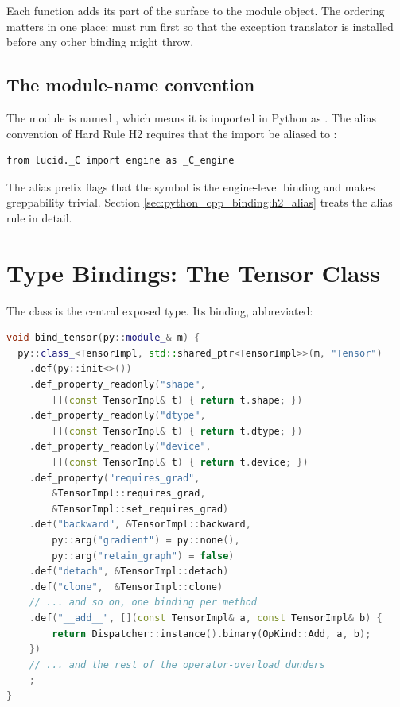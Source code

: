 Each  function adds its part of the
surface to the module object. The ordering matters in one place:
 must run first so that the exception translator
is installed before any other binding might throw.

\subsection{The module-name convention}
\label{ssec:python_cpp_binding:name_convention}

The module is named , which means it is imported in
Python as . The alias convention
of Hard Rule H2 requires that the import be aliased to
:

\begin{lstlisting}[style=lucid,language=LucidPython]
from lucid._C import engine as _C_engine
\end{lstlisting}

The alias prefix  flags that the symbol is the
engine-level binding and makes greppability trivial. Section
\ref{sec:python_cpp_binding:h2_alias} treats the alias rule in
detail.

\section{Type Bindings: The Tensor Class}
\label{sec:python_cpp_binding:tensor_binding}

The  class is the central exposed type. Its binding,
abbreviated:

\begin{lstlisting}[style=lucidcpp,language=C++]
void bind_tensor(py::module_& m) {
  py::class_<TensorImpl, std::shared_ptr<TensorImpl>>(m, "Tensor")
    .def(py::init<>())
    .def_property_readonly("shape",
        [](const TensorImpl& t) { return t.shape; })
    .def_property_readonly("dtype",
        [](const TensorImpl& t) { return t.dtype; })
    .def_property_readonly("device",
        [](const TensorImpl& t) { return t.device; })
    .def_property("requires_grad",
        &TensorImpl::requires_grad,
        &TensorImpl::set_requires_grad)
    .def("backward", &TensorImpl::backward,
        py::arg("gradient") = py::none(),
        py::arg("retain_graph") = false)
    .def("detach", &TensorImpl::detach)
    .def("clone",  &TensorImpl::clone)
    // ... and so on, one binding per method
    .def("__add__", [](const TensorImpl& a, const TensorImpl& b) {
        return Dispatcher::instance().binary(OpKind::Add, a, b);
    })
    // ... and the rest of the operator-overload dunders
    ;
}
\end{lstlisting}

